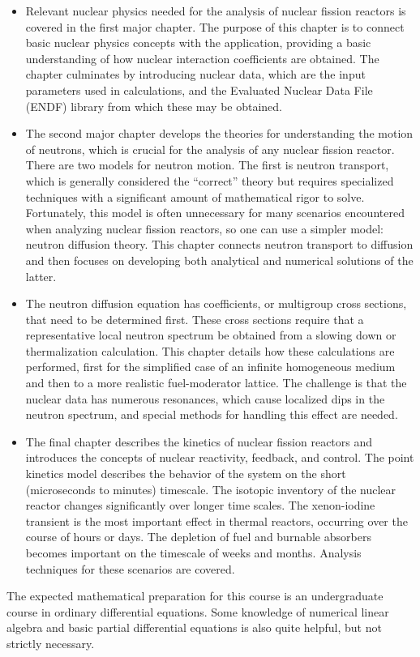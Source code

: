 \begin{itemize}
  \item Relevant nuclear physics needed for the analysis of nuclear fission reactors is covered in the first major chapter. The purpose of this chapter is to connect basic nuclear physics concepts with the application, providing a basic understanding of how nuclear interaction coefficients are obtained. The chapter culminates by introducing nuclear data, which are the input parameters used in calculations, and the Evaluated Nuclear Data File (ENDF) library from which these may be obtained.
  \item The second major chapter develops the theories for understanding the motion of neutrons, which is crucial for the analysis of any nuclear fission reactor. There are two models for neutron motion. The first is neutron transport, which is generally considered the ``correct'' theory but requires specialized techniques with a significant amount of mathematical rigor to solve. Fortunately, this model is often unnecessary for many scenarios encountered when analyzing nuclear fission reactors, so one can use a simpler model: neutron diffusion theory. This chapter connects neutron transport to diffusion and then focuses on developing both analytical and numerical solutions of the latter. %
  \item The neutron diffusion equation has coefficients, or multigroup cross sections, that need to be determined first. These cross sections require that a representative local neutron spectrum be obtained from a slowing down or thermalization calculation. This chapter details how these calculations are performed, first for the simplified case of an infinite homogeneous medium and then to a more realistic fuel-moderator lattice. The challenge is that the nuclear data has numerous resonances, which cause localized dips in the neutron spectrum, and special methods for handling this effect are needed.
  \item The final chapter describes the kinetics of nuclear fission reactors and introduces the concepts of nuclear reactivity, feedback, and control. The point kinetics model describes the behavior of the system on the short (microseconds to minutes) timescale. The isotopic inventory of the nuclear reactor changes significantly over longer time scales. The xenon-iodine transient is the most important effect in thermal reactors, occurring over the course of hours or days. The depletion of fuel and burnable absorbers becomes important on the timescale of weeks and months. Analysis techniques for these scenarios are covered.
\end{itemize}
The expected mathematical preparation for this course is an undergraduate course in ordinary differential equations. Some knowledge of numerical linear algebra and basic partial differential equations is also quite helpful, but not strictly necessary. 

